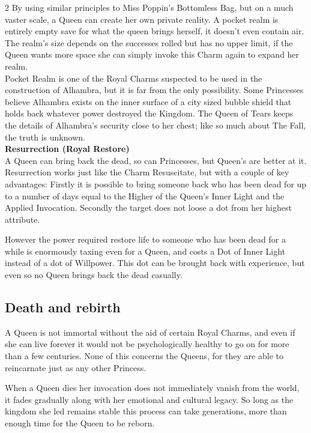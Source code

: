 \begin{multicols}{2}
\noindent By using similar principles to Miss Poppin's Bottomless Bag, but on a much vaster scale, a Queen can create her own private reality. A pocket realm is entirely empty save for what the queen brings herself, it doesn’t even contain air. The realm's size depends on the successes rolled but has no upper limit, if the Queen wants more space she can simply invoke this Charm again to expand her realm.\\

Pocket Realm is one of the Royal Charms suspected to be used in the construction of Alhambra, but it is far from the only possibility. Some Princesses believe Alhambra exists on the inner surface of a city sized bubble shield that holds back whatever power destroyed the Kingdom. The Queen of Tears keeps the details of Alhambra's security close to her chest; like so much about The Fall, the truth is unknown.\\

\noindent \textbf{Resurrection (Royal Restore)}\\

\noindent A Queen can bring back the dead, so can Princesses, but Queen's are better at it. Resurrection works just like the Charm Resuscitate, but with a couple of key advantages: Firstly it is possible to bring someone back who has been dead for up to a number of days equal to the Higher of the Queen's Inner Light and the Applied Invocation. Secondly the target does not loose a dot from her highest attribute. 

However the power required restore life to someone who has been dead for a while is enormously taxing even for a Queen, and costs a Dot of Inner Light instead of a dot of Willpower. This dot can be brought back with experience, but even so no Queen brings back the dead casually.

\subsection*{Death and rebirth}

A Queen is not immortal without the aid of certain Royal Charms, and even if she can live forever it would not be psychologically healthy to go on for more than a few centuries. None of this concerns the Queens, for they are able to reincarnate just as any other Princess. 

When a Queen dies her invocation does not immediately vanish from the world, it fades gradually along with her emotional and cultural legacy. So long as the kingdom she led remains stable this process can take generations, more than enough time for the Queen to be reborn. 


\end{multicols}
